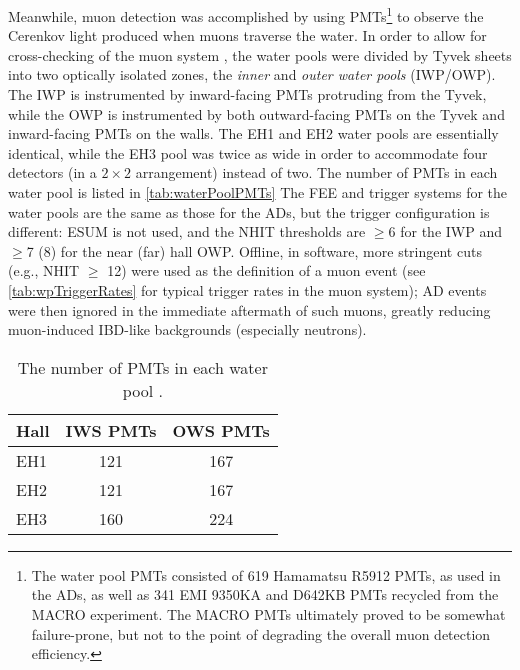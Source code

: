 \documentclass[../thesis.tex]{subfiles}
\begin{document}
Meanwhile, muon detection was accomplished by using PMTs\footnote{The water pool PMTs consisted of 619 Hamamatsu R5912 PMTs, as used in the ADs, as well as 341 EMI 9350KA and D642KB PMTs recycled from the MACRO experiment. The MACRO PMTs ultimately proved to be somewhat failure-prone, but not to the point of degrading the overall muon detection efficiency.} to observe the Cerenkov light produced when muons traverse the water. In order to allow for cross-checking of the muon system \cite{Hack_2014}, the water pools were divided by Tyvek sheets into two optically isolated zones, the \emph{inner} and \emph{outer water pools} (IWP/OWP). The IWP is instrumented by inward-facing PMTs protruding from the Tyvek, while the OWP is instrumented by both outward-facing PMTs on the Tyvek and inward-facing PMTs on the walls. The EH1 and EH2 water pools are essentially identical, while the EH3 pool was twice as wide in order to accommodate four detectors (in a $2\times2$ arrangement) instead of two. The number of PMTs in each water pool is listed in \autoref{tab:waterPoolPMTs} The FEE and trigger systems for the water pools are the same as those for the ADs, but the trigger configuration is different: ESUM is not used, and the NHIT thresholds are $\geq$6 for the IWP and $\ge$7 (8) for the near (far) hall OWP. Offline, in software, more stringent cuts (e.g., NHIT $\geq$ 12) were used as the definition of a muon event (see \autoref{tab:wpTriggerRates} for typical trigger rates in the muon system); AD events were then ignored in the immediate aftermath of such muons, greatly reducing muon-induced IBD-like backgrounds (especially neutrons).

\begin{table}[h]
  \begin{tabular}{lcc}
    \toprule
    Hall & IWS PMTs & OWS PMTs \\
    \midrule
    EH1 & 121 & 167 \\
    EH2 & 121 & 167 \\
    EH3 & 160 & 224 \\
    \bottomrule
  \end{tabular}
  \caption{The number of PMTs in each water pool \cite{AN2016133}.}
  \label{tab:waterPoolPMTs}
\end{table}
\end{document}
